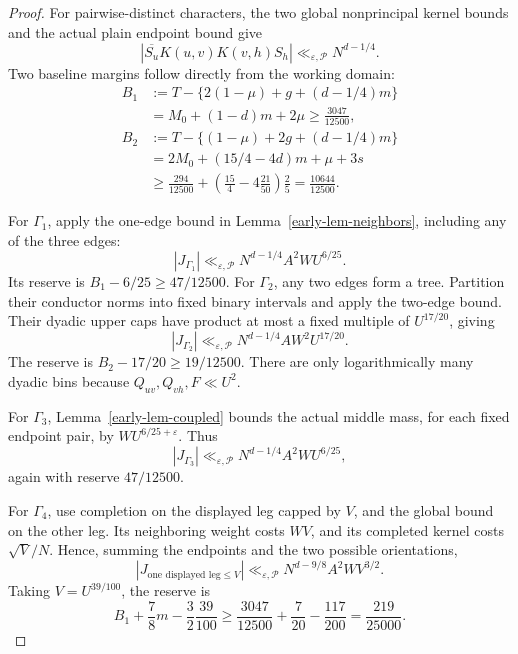 \documentclass[11pt]{article}
\theoremstyle{definition}
\newcommand{\eps}{\varepsilon}
\newcommand{\lls}{\ll_{\eps,\mathcal P}}
\begin{document}
\begin{proof}
For pairwise-distinct characters, the two global nonprincipal kernel
bounds and the actual plain endpoint bound give
\[
 |\overline{S_u}K(u,v)K(v,h)S_h|\lls N^{d-1/4}.
\]
Two baseline margins follow directly from the working domain:
\begin{equation}\label{early-eq-baseline-one}
 \begin{split}
 B_1&:=T-\{2(1-\mu)+g+(d-1/4)m\}\\
    &=M_0+(1-d)m+2\mu\ge\frac{3047}{12500},
 \end{split}
\end{equation}
\begin{equation}\label{early-eq-baseline-two}
 \begin{split}
 B_2&:=T-\{(1-\mu)+2g+(d-1/4)m\}\\
    &=2M_0+(15/4-4d)m+\mu+3s\\
    &\ge\frac{294}{12500}
         +\left(\frac{15}{4}-4\frac{21}{50}\right)\frac25
       =\frac{10644}{12500}.
 \end{split}
\end{equation}

For \(\Gamma_1\), apply the one-edge bound in
Lemma~\ref{early-lem-neighbors}, including any of the three edges:
\[
 |J_{\Gamma_1}|\lls N^{d-1/4}A^2WU^{6/25}.
\]
Its reserve is
\(B_1-6/25\ge47/12500\).
For \(\Gamma_2\), any two edges form a tree.  Partition their
conductor norms into fixed binary intervals and apply the two-edge
bound.  Their dyadic upper caps have product at most a fixed multiple
of \(U^{17/20}\), giving
\[
 |J_{\Gamma_2}|\lls N^{d-1/4}AW^2U^{17/20}.
\]
The reserve is \(B_2-17/20\ge19/12500\).
There are only logarithmically many dyadic bins because
\(Q_{uv},Q_{vh},F\ll U^2\).

For \(\Gamma_3\), Lemma~\ref{early-lem-coupled} bounds the actual
middle mass, for each fixed endpoint pair, by
\(WU^{6/25+\eps}\).  Thus
\[
 |J_{\Gamma_3}|\lls N^{d-1/4}A^2WU^{6/25},
\]
again with reserve \(47/12500\).

For \(\Gamma_4\), use completion on the displayed leg capped by
\(V\), and the global bound on the other leg.
Its neighboring weight costs \(WV\), and its completed kernel
costs \(\sqrt V/N\).  Hence, summing the endpoints and the two
possible orientations,
\[
 |J_{\text{one displayed leg}\le V}|
      \lls N^{d-9/8}A^2WV^{3/2}.
\]
Taking \(V=U^{39/100}\), the reserve is
\[
 B_1+\frac78m-\frac32\frac{39}{100}
 \ge\frac{3047}{12500}+\frac7{20}-\frac{117}{200}
 =\frac{219}{25000}.
\]


\end{proof}
\end{document}
